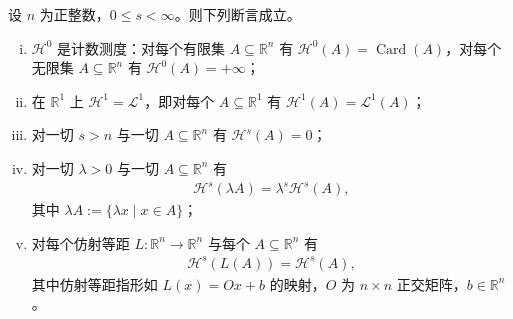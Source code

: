 \documentclass[../../main.tex]{subfiles}%
\begin{document}
\begin{theorem}\label{theorem:ch02-2-2}
设 $n$ 为正整数，$0\leqslant s<\infty$。则下列断言成立。
\begin{enumerate}[(i)]
\item $\mathcal{H}^0$ 是计数测度：对每个有限集 $A\subseteq\mathbb{R}^n$ 有 $\mathcal{H}^0(A)=\operatorname{Card}(A)$，对每个无限集 $A\subseteq\mathbb{R}^n$ 有 $\mathcal{H}^0(A)=+\infty$；
\item 在 $\mathbb{R}^1$ 上 $\mathcal{H}^1=\mathcal{L}^1$，即对每个 $A\subseteq\mathbb{R}^1$ 有 $\mathcal{H}^1(A)=\mathcal{L}^1(A)$；
\item 对一切 $s>n$ 与一切 $A\subseteq\mathbb{R}^n$ 有 $\mathcal{H}^s(A)=0$；
\item 对一切 $\lambda>0$ 与一切 $A\subseteq\mathbb{R}^n$ 有
\begin{align*}
\mathcal{H}^s(\lambda A)=\lambda^s\mathcal{H}^s(A),
\end{align*}
其中 $\lambda A:=\{\lambda x\mid x\in A\}$；
\item 对每个仿射等距 $L:\mathbb{R}^n\to\mathbb{R}^n$ 与每个 $A\subseteq\mathbb{R}^n$ 有
\begin{align*}
\mathcal{H}^s(L(A))=\mathcal{H}^s(A),
\end{align*}
其中仿射等距指形如 $L(x)=Ox+b$ 的映射，$O$ 为 $n\times n$ 正交矩阵，$b\in\mathbb{R}^n$。
\end{enumerate}
\end{theorem}
\end{document}
